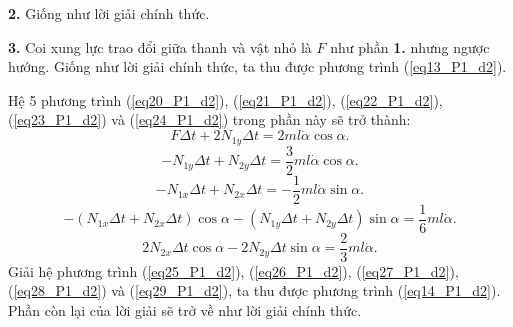\noindent \textbf{2.} Giống như lời giải chính thức.

\noindent \textbf{3.} Coi xung lực trao đổi giữa thanh và vật nhỏ là $F$ như phần \textbf{1.} nhưng ngược hướng. Giống như lời giải chính thức, ta thu được phương trình (\ref{eq13_P1_d2}).

Hệ 5 phương trình  (\ref{eq20_P1_d2}), (\ref{eq21_P1_d2}), (\ref{eq22_P1_d2}), (\ref{eq23_P1_d2}) và (\ref{eq24_P1_d2}) trong phần này sẽ trở thành:
\begin{equation} \label{eq25_P1_d2}
    F \Delta t + 2N_{1y} \Delta t = 2ml \dot{\alpha} \cos \alpha.
\end{equation}
\begin{equation} \label{eq26_P1_d2}
    - N_{1y} \Delta t + N_{2y} \Delta t = \dfrac{3}{2} ml  \dot{\alpha} \cos \alpha.
\end{equation}
\begin{equation} \label{eq27_P1_d2}
    - N_{1x} \Delta t + N_{2x} \Delta t = - \dfrac{1}{2} ml \dot{\alpha} \sin \alpha.
\end{equation}
\begin{equation} \label{eq28_P1_d2}
    -\left( N_{1x} \Delta t + N_{2x} \Delta t \right)\cos \alpha - \left( N_{1y} \Delta t + N_{2y} \Delta t \right) \sin \alpha = \dfrac{1}{6} m l \dot{\alpha}.
\end{equation}
\begin{equation} \label{eq29_P1_d2}
    2 N_{2x} \Delta t \cos \alpha - 2 N_{2y} \Delta t \sin \alpha = \dfrac{2}{3} m l \dot{\alpha}.
\end{equation}
Giải hệ phương trình (\ref{eq25_P1_d2}), (\ref{eq26_P1_d2}), (\ref{eq27_P1_d2}), (\ref{eq28_P1_d2}) và (\ref{eq29_P1_d2}), ta thu được phương trình (\ref{eq14_P1_d2}). Phần còn lại của lời giải sẽ trở về như lời giải chính thức.

\vspace{5mm}

